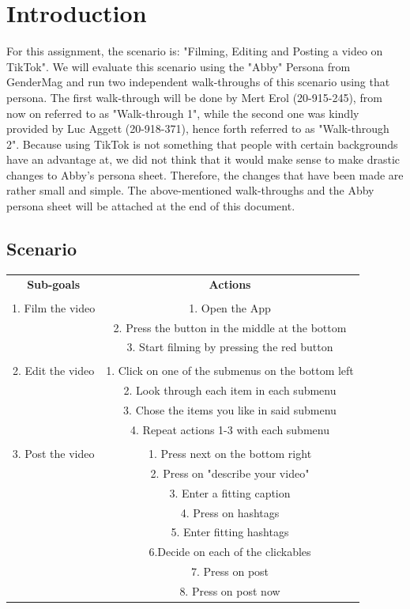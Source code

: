 \documentclass[12pt, letterpaper]{article}
\begin{document}


\newpage
\tableofcontents
\newpage


\section{Introduction}
For this assignment, the scenario is: "Filming, Editing and Posting a video on TikTok". We will evaluate this scenario using the "Abby" Persona from GenderMag and run two independent walk-throughs of this scenario using that persona. The first walk-through will be done by Mert Erol (20-915-245), from now on referred to as "Walk-through 1", while the second one was kindly provided by Luc Aggett (20-918-371), hence forth referred to as "Walk-through 2".\newline
Because using TikTok is not something that people with certain backgrounds have an advantage at, we did not think that it would make sense to make drastic changes to Abby's persona sheet. Therefore, the changes that have been made are rather small and simple. The above-mentioned walk-throughs and the Abby persona sheet will be attached at the end of this document.\\

\subsection{Scenario}
\begin{center}
    \begin{tabular}{|c|c|}
    \hline
        \textbf{Sub-goals} & \textbf{Actions} \\
        \\
        1. Film the video & 1. Open the App \\
        & 2. Press the button in the middle at the bottom \\
        & 3. Start filming by pressing the red button \\ 
        \\
        2. Edit the video & 1. Click on one of the submenus on the bottom left \\
        & 2. Look through each item in each submenu \\
        & 3. Chose the items you like in said submenu \\
        & 4. Repeat actions 1-3 with each submenu \\
        \\
        3. Post the video & 1. Press next on the bottom right \\
        & 2. Press on "describe your video" \\
        & 3. Enter a fitting caption \\
        & 4. Press on hashtags \\
        & 5. Enter fitting hashtags \\
        & 6.Decide on each of the clickables \\
        & 7. Press on post \\
        & 8. Press on post now \\
    \hline
    \end{tabular}
\end{center}
\newpage
\end{document}

